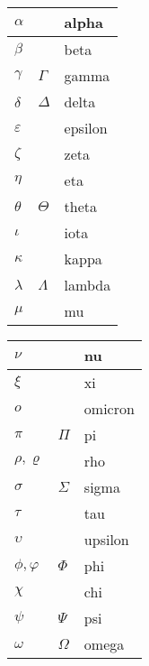 \documentclass[class=report,crop=false]{standalone}
\begin{document}
\begin{center}
\setlength{\arrayrulewidth}{0.05mm}
\begin{tabular}[t]{|ll|l@{\vrule depth 1.2ex height 3ex width 0mm \ }|}
\hline
   $\alpha$      &               & alpha   \\ \hline
   $\beta$       &               & beta    \\ \hline
   $\gamma$      & $\Gamma$      & gamma   \\ \hline
   $\delta$      & $\Delta$      & delta   \\ \hline
   $\varepsilon$ &               & epsilon \\ \hline
   $\zeta$       &               & zeta    \\ \hline
   $\eta$        &               & eta     \\ \hline
   $\theta$      & $\Theta$      & theta   \\ \hline
   $\iota$       &               & iota    \\ \hline
   $\kappa$      &               & kappa   \\ \hline
   $\lambda$     & $\Lambda$     & lambda  \\ \hline
   $\mu$         &               & mu      \\ \hline
\end{tabular}
\hspace*{2cm}
\begin{tabular}[t]{|ll|l@{\vrule depth 1.2ex height 3ex width 0mm \ }|}
\hline
   $\nu$         &               & nu      \\ \hline
   $\xi$         &               & xi      \\ \hline
   $o$           &               & omicron \\ \hline
   $\pi$         & $\Pi$         & pi      \\ \hline
   $\rho,\varrho$ &              & rho     \\ \hline
   $\sigma$      & $\Sigma$      & sigma   \\ \hline
   $\tau$        &               & tau     \\ \hline
   $\upsilon$    &               & upsilon \\ \hline
   $\phi,\varphi$& $\Phi$        & phi     \\ \hline
   $\chi$        &               & chi     \\ \hline
   $\psi$        & $\Psi$        & psi     \\ \hline
   $\omega$      & $\Omega$      & omega   \\ \hline
\end{tabular}\hfill
\end{center}
\end{document}
